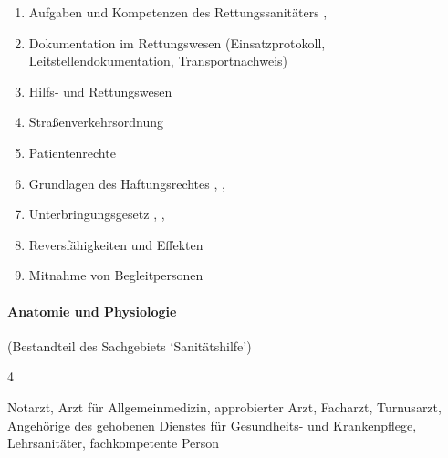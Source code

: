   \begin{enumerate}\item
    
    Aufgaben und Kompetenzen des  Rettungssanitäters \dotfill {},
    \item    Dokumentation im Rettungswesen (Einsatzprotokoll, Leitstellendokumentation, Transportnachweis) \dotfill {}
    \item    Hilfs- und Rettungswesen \dotfill  {}
    \item    Straßenverkehrsordnung \dotfill {}
    \item    Patientenrechte \dotfill {}
    \item    Grundlagen des Haftungsrechtes \dotfill  {},
    ,
    \item    Unterbringungsgesetz \dotfill {},
    ,
    \item    Reversfähigkeiten und Effekten \dotfill {}
    \item    Mitnahme von Begleitpersonen
    \\
  \end{enumerate}
  

\paragraph{Anatomie und Physiologie}
(Bestandteil des Sachgebiets \enquote*{Sanitätshilfe})
  
  \begin{inparadesc}
    \item[Stundenanzahl:] 4
    \item[Lehrkraft:]  Notarzt, Arzt für Allgemeinmedizin, approbierter Arzt,
    Facharzt, Turnusarzt,   Angehörige  des  gehobenen  Dienstes für Gesundheits-
    und Krankenpflege, Lehrsanitäter, fachkompetente Person
  \end{inparadesc}
  
